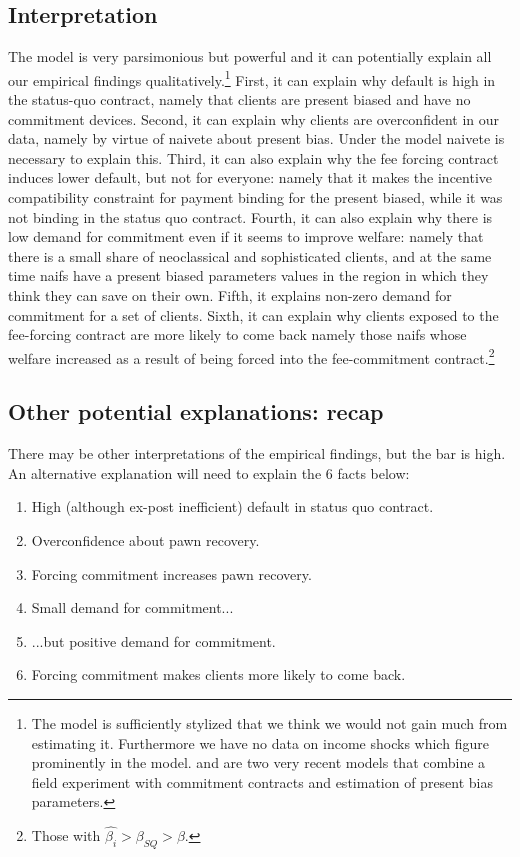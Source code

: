 \documentclass[oneside,11pt]{article}
\begin{document}
\subsection{Interpretation}

The model is very parsimonious but powerful and it can potentially explain all our empirical findings qualitatively.\footnote{The model is sufficiently stylized that we think we would not gain much from estimating it. Furthermore we have no data on income shocks which figure prominently in the model. \cite{Ted} and \cite{Aprajit} are two very recent models that combine a field experiment with commitment contracts and estimation of present bias parameters.} First, it can explain why default is high in the status-quo contract, namely that clients are present biased and have no commitment devices. Second, it can explain why clients are overconfident in our data, namely by virtue of naivete about present bias. Under the model naivete is necessary to explain this. Third, it can also explain why the fee forcing contract induces lower default, but not for everyone: namely that it makes the incentive compatibility constraint for payment binding for the present biased, while it was not binding in the status quo contract. Fourth, it can also explain why there is low demand for commitment even if it seems to improve welfare: namely that there is a small share of neoclassical and sophisticated clients, and at the same time naifs have a present biased parameters values in the region in which they think they can save on their own. Fifth, it explains non-zero demand for commitment for a set of clients. Sixth, it can explain why clients exposed to the fee-forcing contract are more likely to come back namely those naifs whose welfare increased as a result of being forced into the fee-commitment contract.\footnote{Those with $\hat{\beta_i}>\beta_{SQ}>\beta$.}


\subsection{Other potential explanations: recap} \label{explanations_recap}

There may be other interpretations of the empirical findings, but the bar is high. An alternative explanation will need to explain the 6 facts below:

\begin{enumerate}
\itemsep0em 
\item High (although ex-post inefficient) default in status quo contract.
\item Overconfidence about pawn recovery.
\item Forcing commitment increases pawn recovery.
\item Small demand for commitment...
\item ...but positive demand for commitment.
\item Forcing commitment makes clients more likely to come back.
\end{enumerate}
\end{document}
